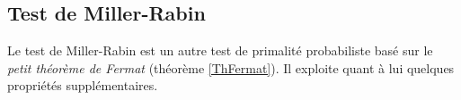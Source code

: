 \subsection{Test de Miller-Rabin}
	Le test de Miller-Rabin est un autre test de primalité probabiliste basé sur le \textit{petit théorème de Fermat} (théorème \ref{ThFermat}). Il exploite quant à lui quelques propriétés supplémentaires.

